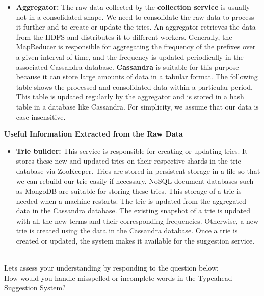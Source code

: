 \begin{itemize}
\item
\protect{}\label{scxfGm_jhw7JxTF9K478W}
\textbf{Aggregator:} The raw data collected by the \textbf{collection service} is usually not in a consolidated shape. We need to consolidate the raw data to process it further and to create or update the tries. An aggregator retrieves the data from the HDFS and distributes it to different workers. Generally, the MapReducer is responsible for aggregating the frequency of the prefixes over a given interval of time, and the frequency is updated periodically in the associated Cassandra database. \textbf{Cassandra} is suitable for this purpose because it can store large amounts of data in a tabular format. The following table shows the processed and consolidated data within a particular period. This table is updated regularly by the aggregator and is stored in a hash table in a database like Cassandra. For simplicity, we assume that our data is case insensitive.
\end{itemize}

\textbf{Useful Information Extracted from the Raw Data}

\begin{table}[htbp]
\centering
\small
{}
\caption{Useful Information Extracted from the Raw Data}
\end{table}

\begin{itemize}
\item
\protect{}\label{GkJazt1HyjH12ShATilhj}
\textbf{Trie builder:} This service is responsible for creating or updating tries. It stores these new and updated tries on their respective shards in the trie database via ZooKeeper. Tries are stored in persistent storage in a file so that we can rebuild our trie easily if necessary. NoSQL document databases such as MongoDB are suitable for storing these tries. This storage of a trie is needed when a machine restarts. The trie is updated from the aggregated data in the Cassandra database. The existing snapshot of a trie is updated with all the new terms and their corresponding frequencies. Otherwise, a new trie is created using the data in the Cassandra database. Once a trie is created or updated, the system makes it available for the suggestion service.
\end{itemize}
\\
Let\textquotesingle s assess your understanding by responding to the question below:
\\
How would you handle misspelled or incomplete words in the Typeahead Suggestion System?

